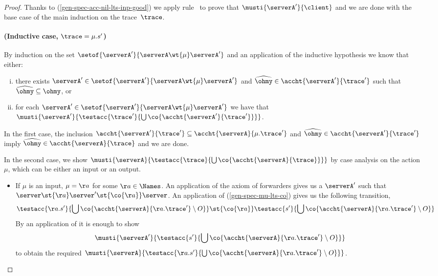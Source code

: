 {\begin{proof}
  Thanks to (\ref{gen-spec-acc-nil-lts-inp-good}) we apply
  rule \mnow\ to prove that $\musti{\serverA'}{ \client }$ and we are done
  with the base case of the main induction on the trace~$\trace$.




  \paragraph{(Inductive case, $\trace =  \mu.s'$)}
  By induction on the set $\setof{\serverA'}{\serverA \wt{\mu} \serverA'}$
  and an application of the inductive hypothesis we know that either:
  \begin{enumerate}[(i)]
  \item\label{completeness-part-2.2-auxiliary-2-2-2}
    there exists $\serverA' \in \setof{\serverA'}{\serverA \wt{\mu} \serverA'}$
    and $\widehat{\ohmy} \in \accht{\serverA'}{\trace'}$
    such that $\widehat{\ohmy} \subseteq \ohmy$, or
  \item\label{completeness-part-2.2-auxiliary-2-2-1}
    for each $\serverA' \in \setof{\serverA'}{\serverA \wt{\mu} \serverA'}$ we have that
    $\musti{\serverA'}{\testacc{\trace'}{\bigcup \co{\accht{\serverA'}{\trace'}}}}$.
  \end{enumerate}

  In the first case, the inclusion $\accht{\serverA'}{\trace'} \subseteq \accht{\serverA}{\mu.\trace'}$
  and $\widehat{\ohmy} \in \accht{\serverA'}{\trace'}$ imply
  $\widehat{\ohmy} \in \accht{\serverA}{\trace}$ and we are done.

  In the second case, we show
  $\musti{\serverA}{\testacc{\trace}{\bigcup \co{\accht{\serverA}{\trace}}}}$
  by case analysis on the action~$\mu$, which can be either an input or an output.
  \begin{itemize}
  \item If $\mu$ is an input, $\mu = \aa$ for some $\aa \in \Names$.
    An application of the axiom of forwarders gives us a $\serverA'$ such that
    $\server \st{\aa} \server' \st{\co{\aa}} \server$.
    An application of (\ref{gen-spec-mu-lts-co})
    gives us the following transition,
    $$
    \testacc{\aa.s'}{\bigcup \co{ \accht{\serverA}{\aa.\trace'} \setminus O}}
    \st{\co{\aa}}
    \testacc{s'}{\bigcup \co{ \accht{\serverA}{\aa.\trace'} \setminus O}}
    $$
    By an application of  it is enough to show
    $$
    \musti{\serverA'}{\testacc{s'}{\bigcup \co{\accht{\serverA}{\aa.\trace'} \setminus O}}}
    $$
    to obtain the required
    $\musti{\serverA}{\testacc{\aa.s'}{\bigcup
        \co{\accht{\serverA}{\aa.\trace'} \setminus O}}}$.


\end{itemize}
\end{proof}}
